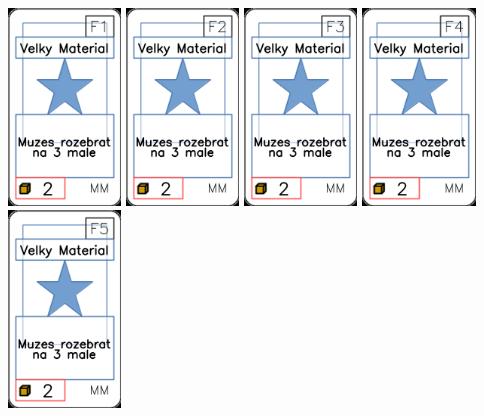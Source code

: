 \documentclass[a4paper]{article}
\begin{document}
	\includegraphics[width=3.0cm]{img-1_55}
	\includegraphics[width=3.0cm]{img-1_56}
	\includegraphics[width=3.0cm]{img-1_57}
	\includegraphics[width=3.0cm]{img-1_58}
	\includegraphics[width=3.0cm]{img-1_59}
\end{document}
